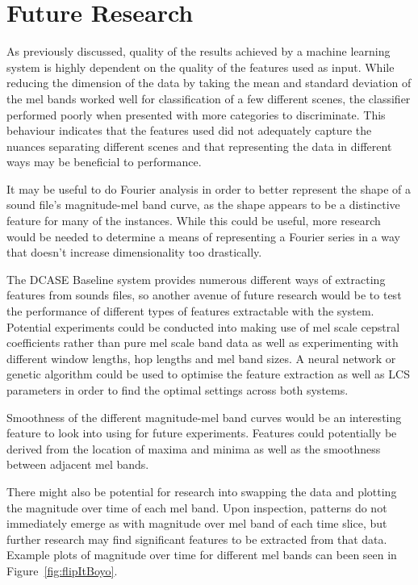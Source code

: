\documentclass[11pt]{article}
\begin{document}
\pagebreak
\section{Future Research}

As previously discussed, quality of the results achieved by a machine learning system is highly dependent on the quality of the features used as input. While reducing the dimension of the data by taking the mean and standard deviation of the mel bands worked well for classification of a few different scenes, the classifier performed poorly when presented with more categories to discriminate. This behaviour indicates that the features used did not adequately capture the nuances separating different scenes and that representing the data in different ways may be beneficial to performance.

It may be useful to do Fourier analysis in order to better represent the shape of a sound file's magnitude-mel band curve, as the shape appears to be a distinctive feature for many of the instances. While this could be useful, more research would be needed to determine a means of representing a Fourier series in a way that doesn't increase dimensionality too drastically.

The DCASE Baseline system provides numerous different ways of extracting features from sounds files, so another avenue of future research would be to test the performance of different types of features extractable with the system. Potential experiments could be conducted into making use of mel scale cepstral coefficients rather than pure mel scale band data as well as experimenting with different window lengths, hop lengths and mel band sizes. A neural network or genetic algorithm could be used to optimise the feature extraction as well as LCS parameters in order to find the optimal settings across both systems.

Smoothness of the different magnitude-mel band curves would be an interesting feature to look into using for future experiments. Features could potentially be derived from the location of maxima and minima as well as the smoothness between adjacent mel bands.

There might also be potential for research into swapping the data and plotting the magnitude over time of each mel band. Upon inspection, patterns do not immediately emerge as with magnitude over mel band of each time slice, but further research may find significant features to be extracted from that data. Example plots of magnitude over time for different mel bands can been seen in Figure~\ref{fig:flipItBoyo}.
\end{document}

